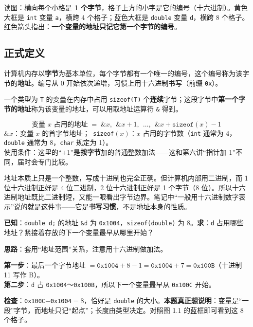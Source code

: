 \documentclass[UTF8,a4paper,11pt,fontset=none,zihao=-4]{ctexart}
\newcommand{\cpp}[1]{\lstinline[style=cpp,basicstyle=\ttfamily,numbers=none]{#1}}
\newcommand{\cc}[1]{\texttt{#1}}
\begin{document}
读图：横向每个小格是 \textbf{1 个字节}，格子上方的小字是它的编号（十六进制）。黄色大框是 \cc{int} 变量 \cc{a}，横跨 4 个格子；蓝色大框是 \cc{double} 变量 \cc{d}，横跨 8 个格子。红色箭头指出：\textbf{一个变量的地址只记它第一个字节的编号}。

\subsection{正式定义}
\begin{definitionbox}[内存地址]
计算机内存以\textbf{字节}为基本单位，每个字节都有一个唯一的编号，这个编号称为该字节的\textbf{地址}。编号从 0 开始依次递增，习惯上用十六进制书写（前缀 \cc{0x}）。

一个类型为 \cc{T} 的变量在内存中占用 \cc{sizeof(T)} 个\textbf{连续}字节；这段字节中\textbf{第一个字节的地址}称为该变量的地址，可以用取地址运算符 \cc{\&} 得到。
\end{definitionbox}

\begin{formulabox}[变量占用的地址范围]
\[
\boxed{\;\text{变量 } x \text{ 占用的地址} \;=\; \&x,\ \ \&x+1,\ \ \dots,\ \ \&x+\texttt{sizeof}(x)-1\;}
\]
\small $\&x$：变量 $x$ 的首字节地址；\ \texttt{sizeof}$(x)$：$x$ 占用的字节数（\cc{int} 通常为 4，\cc{double} 通常为 8，\cc{char} 规定为 1）。\\
使用条件：这里的“$+1$”是\textbf{按字节}加的普通整数加法——这和第六讲“指针加 1”不同，届时会专门比较。
\end{formulabox}

\begin{intuitionbox}[为什么地址习惯用十六进制]
地址本质上只是一个整数，写成十进制也完全正确。但计算机内部用二进制，而 1 位十六进制正好是 4 位二进制，2 位十六进制正好是 1 个字节（8 位）。所以十六进制地址既比二进制短，又能一眼看出字节边界。笔记中“一般用十六进制数字表示”说的就是这件事——它是\textbf{书写习惯}，不是地址本身的性质。
\end{intuitionbox}

\begin{examplebox}
\textbf{已知}：\cpp{double d;} 的地址 \cc{\&d} 为 \cc{0x1004}，\cpp{sizeof(double)} 为 8。\quad\textbf{求}：\cc{d} 占用哪些地址？紧接着存放的下一个变量最早从哪里开始？

\textbf{思路}：套用“地址范围”关系，注意用十六进制做加法。

\textbf{第一步}：最后一个字节地址 $=\texttt{0x1004}+8-1=\texttt{0x1004}+7=\texttt{0x100B}$（十进制 11 写作 B）。\\
\textbf{第二步}：\cc{d} 占 \cc{0x1004}～\cc{0x100B}，所以下一个变量最早从 \cc{0x100C} 开始。

\textbf{检查}：\cc{0x100C}$-$\cc{0x1004}$=8$，恰好是 \cc{double} 的大小。\quad\textbf{本题真正想说明}：变量是“一段”字节，而地址只记“起点”；长度由类型决定。对照图 1.1 的蓝框即可看到这 8 个格子。
\end{examplebox}
\end{document}
